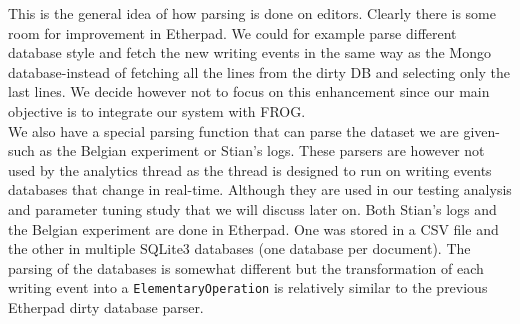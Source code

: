 \documentclass[a4, twocolumn, 12pt]{article}
\begin{document}
This is the general idea of how parsing is done on editors. Clearly there is some room for improvement in Etherpad. We could for example parse different database style and fetch the new writing events in the same way as the Mongo database-instead of fetching all the lines from the dirty DB and selecting only the last lines. We decide however not to focus on this enhancement since our main objective is to integrate our system with FROG.\\
We also have a special parsing function that can parse the dataset we are given-such as the Belgian experiment or Stian’s logs. These parsers are however not used by the analytics thread as the thread is designed to run on writing events databases that change in real-time. Although they are used in our testing analysis and parameter tuning study that we will discuss later on. Both Stian’s logs and the Belgian experiment are done in Etherpad. One was stored in a CSV file and the other in multiple SQLite3 databases (one database per document). The parsing of the databases is somewhat different but the transformation of each writing event into a \texttt{ElementaryOperation} is relatively similar to the previous Etherpad dirty database parser.
\end{document}
